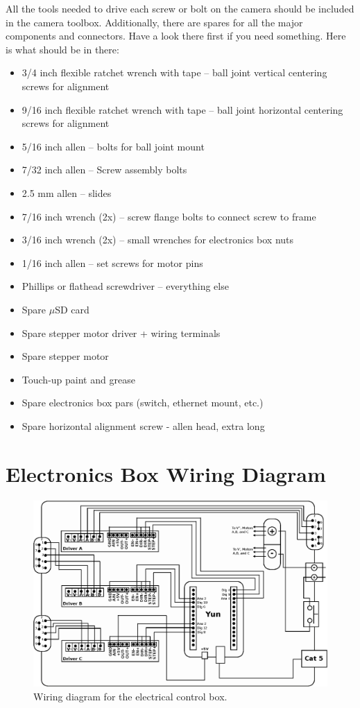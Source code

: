 \documentclass[11pt]{article}
\begin{document}
All the tools needed to drive each screw or bolt on the camera should be included in the camera toolbox. 
Additionally, there are spares for all the major components and connectors.
Have a look there first if you need something.
Here is what should be in there:

\begin{itemize}
	\item 3/4 inch flexible ratchet wrench with tape -- ball joint vertical centering screws for alignment
	\item 9/16 inch flexible ratchet wrench with tape -- ball joint horizontal centering screws for alignment
	\item 5/16 inch allen -- bolts for ball joint mount
	\item 7/32 inch allen -- Screw assembly bolts
	\item 2.5 mm allen -- slides
	\item 7/16 inch wrench (2x) -- screw flange bolts to connect screw to frame
	\item 3/16 inch wrench (2x) -- small wrenches for electronics box nuts
	\item 1/16 inch allen -- set screws for motor pins
	\item Phillips or flathead screwdriver -- everything else
	\item Spare $\mu$SD card
	\item Spare stepper motor driver + wiring terminals
	\item Spare stepper motor
	\item Touch-up paint and grease
	\item Spare electronics box pars (switch, ethernet mount, etc.)
	\item Spare horizontal alignment screw - allen head, extra long
\end{itemize}


\section{Electronics Box Wiring Diagram}
\begin{figure}[h]
\begin{center}
\includegraphics[width = 5.5in]{wiringDrawingUpdate.eps}
\caption{Wiring diagram for the electrical control box.}  
\label{elecFit}
\end{center}
\end{figure}
\end{document}
